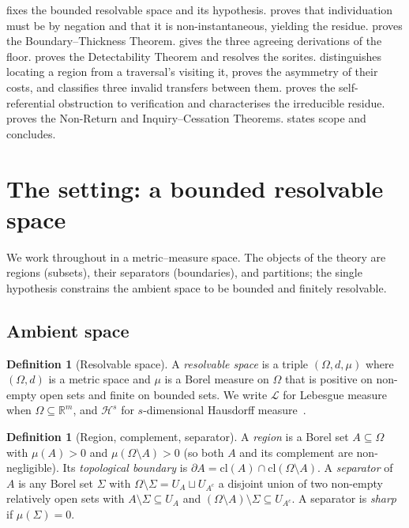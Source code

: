 \documentclass[11pt,a4paper]{article}
\theoremstyle{thmstyle}
\theoremstyle{definition}
\newtheorem{definition}[theorem]{Definition}
\theoremstyle{remark}
\newcommand{\R}{\mathbb{R}}
\newcommand{\Space}{\Omega}
\newcommand{\Bdy}{\partial}
\newcommand{\cl}{\mathrm{cl}}
\newcommand{\Leb}{\mathcal{L}}
\newcommand{\Haus}{\mathcal{H}}
\begin{document}
 fixes the bounded resolvable space and its hypothesis.
 proves that individuation must be by negation and that it
is non-instantaneous, yielding the residue.  proves the
Boundary--Thickness Theorem.  gives the three agreeing
derivations of the floor.  proves the Detectability Theorem
and resolves the sorites.  distinguishes locating a region
from a traversal's visiting it, proves the asymmetry of their costs, and
classifies three invalid transfers between them.  proves the
self-referential obstruction to verification and characterises the irreducible
residue.  proves the Non-Return and Inquiry--Cessation
Theorems.  states scope and concludes.


\section{The setting: a bounded resolvable space}
\label{sec:setting}

We work throughout in a metric--measure space. The objects of the theory are
regions (subsets), their separators (boundaries), and partitions; the single
hypothesis constrains the ambient space to be bounded and finitely resolvable.

\subsection{Ambient space}

\begin{definition}[Resolvable space]
\label{def:space}
A \emph{resolvable space} is a triple $(\Space,d,\mu)$ where $(\Space,d)$ is a
metric space and $\mu$ is a Borel measure on $\Space$ that is positive on
non-empty open sets and finite on bounded sets. We write $\Leb$ for Lebesgue
measure when $\Space\subseteq\R^{m}$, and $\Haus^{s}$ for $s$-dimensional
Hausdorff measure~\citep{federer1969,mattila1995}.
\end{definition}

\begin{definition}[Region, complement, separator]
\label{def:region}
A \emph{region} is a Borel set $A\subseteq\Space$ with
$\mu(A)>0$ and $\mu(\Space\setminus A)>0$ (so both $A$ and its complement are
non-negligible). Its \emph{topological boundary} is
$\Bdy A=\cl(A)\cap\cl(\Space\setminus A)$. A \emph{separator} of $A$ is any
Borel set $\Sigma$ with $\Space\setminus\Sigma=U_A\sqcup U_{A^c}$ a disjoint
union of two non-empty relatively open sets with $A\setminus\Sigma\subseteq
U_A$ and $(\Space\setminus A)\setminus\Sigma\subseteq U_{A^c}$. A separator is
\emph{sharp} if $\mu(\Sigma)=0$.
\end{definition}
\end{document}
